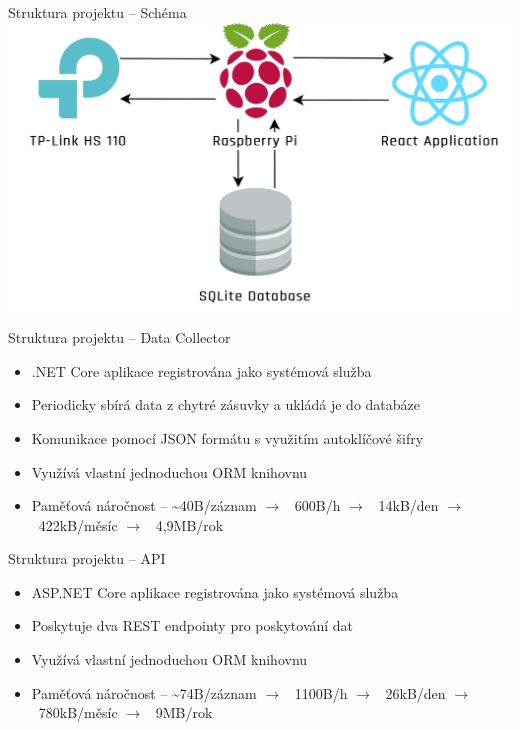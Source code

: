 \documentclass{beamer}
\begin{document}
\begin{frame}{Struktura projektu – Schéma}
	\centering
	\includegraphics[scale=0.175]{AppDesign}
\end{frame}

\begin{frame}{Struktura projektu – Data Collector}
	\begin{itemize}
		\item .NET Core aplikace registrována jako systémová služba
		\item Periodicky sbírá data z chytré zásuvky a ukládá je do databáze
		\item Komunikace pomocí JSON formátu s využitím autoklíčové šifry
		\item Využívá vlastní jednoduchou ORM knihovnu
		\item Paměťová náročnost – \textasciitilde40B/záznam $\rightarrow$ ~600B/h $\rightarrow$ ~14kB/den $\rightarrow$ ~422kB/měsíc $\rightarrow$ ~4,9MB/rok
	\end{itemize}
\end{frame}

\begin{frame}{Struktura projektu – API}
	\begin{itemize}
		\item ASP.NET Core aplikace registrována jako systémová služba
		\item Poskytuje dva REST endpointy pro poskytování dat
		\item Využívá vlastní jednoduchou ORM knihovnu
		\item Paměťová náročnost – \textasciitilde74B/záznam $\rightarrow$ ~1100B/h $\rightarrow$ ~26kB/den $\rightarrow$ ~780kB/měsíc $\rightarrow$ ~9MB/rok
	\end{itemize}
\end{frame}
\end{document}
